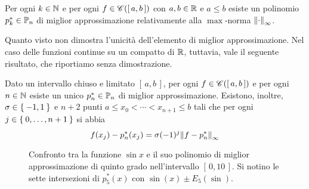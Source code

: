 	\begin{corollario}
		Per ogni \(k \in \N\) e per ogni \(f \in \cont ([\, a, b \,])\) con \(a, b \in \R\) e \(a \le b\) esiste un polinomio \(p_k^* \in \P_n\) di miglior approssimazione relativamente alla \(\max\)-norma \(\norm{\cdot}_{\infty}\).
	\end{corollario}

	 Quanto visto non dimostra l'unicità dell'elemento di miglior approssimazione. Nel caso delle funzioni continue su un compatto di \(\R\), tuttavia, vale il seguente risultato, che riportiamo senza dimostrazione.
	 
	 \begin{teorema}\label{th:chebyshev-equiosc}
	 	Dato un intervallo chiuso e limitato \([\, a, b \,]\), per ogni \(f \in \cont ([\, a, b \,])\) e per ogni \(n \in \N\) esiste un unico \(p_n^* \in \P_n\) di miglior approssimazione. Esistono, inoltre, \(\sigma \in \Set{- 1, 1}\) e \(n + 2\) punti \(a \le x_0 < \cdots < x_{n + 1} \le b\) tali che per ogni \(j \in \Set{0, \dots, n + 1}\) si abbia
	 	\begin{equation}
	 		f (x_j) - p_n^* (x_j) = \sigma (-1)^j \norm{f - p_n^*}_{\infty}
	 	\end{equation}
	 \end{teorema}
 
 	\begin{figure}[tpb]
 		\centering
 		
 	
 		\caption{Confronto tra la funzione \(\sin x\) e il suo polinomio di miglior approssimazione di quinto grado nell'intervallo \([\, 0, 10 \,]\). Si notino le sette intersezioni di \(p_5^* (x)\) con \(\sin (x) \pm E_5 (\sin)\).}\label{fig:sin-migl-approx}
 	\end{figure}
 
